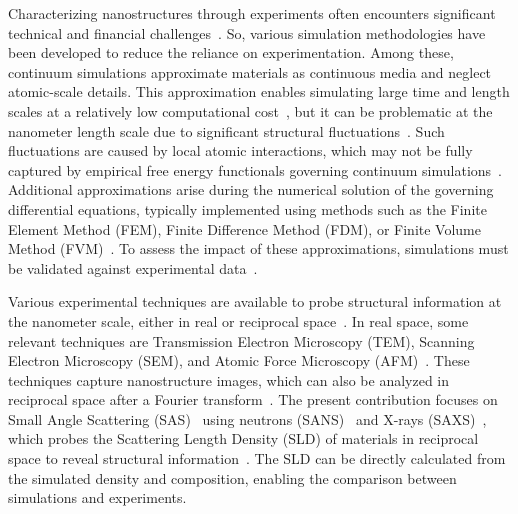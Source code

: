 \documentclass[preprint, 5p, times, twocolumn]{elsarticle}
\begin{document}
Characterizing nanostructures through experiments often encounters significant technical and financial challenges~\cite{wang2016review}. So, various simulation methodologies have been developed to reduce the reliance on experimentation. Among these, continuum simulations approximate materials as continuous media and neglect atomic-scale details. This approximation enables simulating large time and length scales at a relatively low computational cost~\cite{ghavanloo2019computational}, but it can be problematic at the nanometer length scale due to significant structural fluctuations~\cite{williams2004nanoscale}. Such fluctuations are caused by local atomic interactions, which may not be fully captured by empirical free energy functionals governing continuum simulations~\cite{ghavanloo2019computational}. Additional approximations arise during the numerical solution of the governing differential equations, typically implemented using methods such as the Finite Element Method (FEM), Finite Difference Method (FDM), or Finite Volume Method (FVM)~\cite{holmes2007introduction}. To assess the impact of these approximations, simulations must be validated against experimental data~\cite{duran2020simulation}. 

Various experimental techniques are available to probe structural information at the nanometer scale, either in real or reciprocal space~\cite{hoernqvist2015early}. In real space, some relevant techniques are Transmission Electron Microscopy (TEM), Scanning Electron Microscopy (SEM), and Atomic Force Microscopy (AFM)~\cite{zhu2010afm}. These techniques capture nanostructure images, which can also be analyzed in reciprocal space after a Fourier transform~\cite{taylor2013objective}. The present contribution focuses on Small Angle Scattering (SAS)~\cite{PaNET_sas} using neutrons (SANS)~\cite{PaNET_sans} and X-rays (SAXS)~\cite{PaNET_saxs}, which 
probes the Scattering Length Density (SLD) of materials in reciprocal space to reveal structural information~\cite{sivia2011elementary}. The SLD can be directly calculated from the simulated density and composition, enabling the comparison between simulations and experiments.
\end{document}
